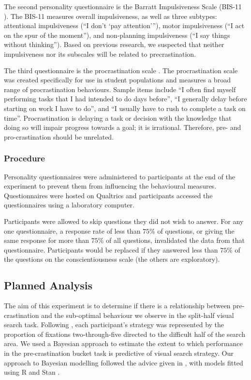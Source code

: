 \documentclass[]{rsos}
\begin{document}
The second personality questionnaire is the Barratt Impulsiveness Scale (BIS-11 \cite{patton1995}). The BIS-11 measures overall impulsiveness, as well as three subtypes: attentional impulsiveness (``I don't `pay attention'''), motor impulsiveness (``I act on the spur of the moment''), and non-planning impulsiveness (``I say things without thinking''). Based on previous research, we suspected that neither impulsiveness nor its subscales will be related to precrastination.

The third questionnaire is the procrastination scale \cite{lay1986}. The procrastination scale was created specifically for use in student populations and measures a broad range of procrastination behaviours. Sample items include ``I often find myself performing tasks that I had intended to do days before'', ``I generally delay before starting on work I have to do'', and ``I usually have to rush to complete a task on time''. Procrastination is delaying a task or decision with the knowledge that doing so will impair progress towards a goal; it is irrational. Therefore, pre- and pro-crastination should be unrelated.

\subsubsection{Procedure}

Personality questionnaires were administered to participants at the end of the experiment to prevent them from influencing the behavioural measures. Questionnaires were hosted on Qualtrics and participants accessed the questionnaires using a laboratory computer.

Participants were allowed to skip questions they did not wish to answer. For any one questionnaire, a response rate of less than $75\%$ of questions, or giving the same response for more than $75\%$ of all questions, invalidated the data from that questionnaire. Participants would be replaced if they answered less than $75\%$ of the questions on the conscientiousness scale (the others are exploratory).

\subsection{Planned Analysis}

The aim of this experiment is to determine if there is a relationship between pre-crastination and the sub-optimal behaviour we observe in the split-half visual search task. Following \cite{nowakowska2017, clarke2019}, each participant's strategy was represented by the proportion of fixations two-through-five directed to the difficult half of the search area. We used a Bayesian approach to estimate the extent to which performance in the pre-crastination bucket task is predictive of visual search strategy. Our approach to Bayesian modelling followed the advice given in \cite{mcelreath2016}, with models fitted using R \cite{r2019} and Stan \cite{carpenter2017stan}. 
\end{document}
